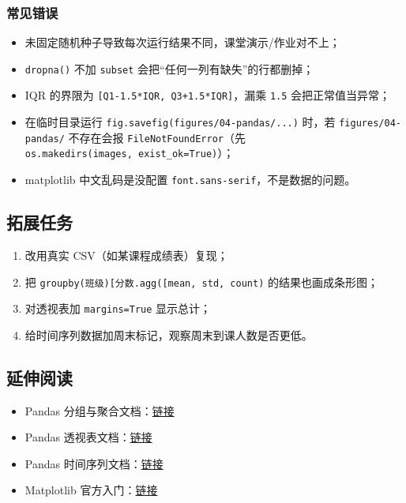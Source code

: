 \subsubsection{常见错误}\label{ux5e38ux89c1ux9519ux8bef-20}

\begin{itemize}
\tightlist
\item
  未固定随机种子导致每次运行结果不同，课堂演示/作业对不上；
\item
  \texttt{dropna()} 不加 \texttt{subset}
  会把``任何一列有缺失''的行都删掉；
\item
  IQR 的界限为 \texttt{{[}Q1-1.5*IQR,\ Q3+1.5*IQR{]}}，漏乘 \texttt{1.5}
  会把正常值当异常；
\item
  在临时目录运行
  \texttt{fig.savefig(\textquotesingle{}figures/04-pandas/...\textquotesingle{})}
  时，若 \texttt{figures/04-pandas/} 不存在会报
  \texttt{FileNotFoundError}（先
  \texttt{os.makedirs(\textquotesingle{}images\textquotesingle{},\ exist\_ok=True)}）；
\item
  matplotlib 中文乱码是没配置 \texttt{font.sans-serif}，不是数据的问题。
\end{itemize}

\subsection{拓展任务}\label{ux62d3ux5c55ux4efbux52a1-4}

\begin{enumerate}
\def\labelenumi{\arabic{enumi}.}
\tightlist
\item
  改用真实 CSV（如某课程成绩表）复现；
\item
  把
  \texttt{groupby(\textquotesingle{}班级\textquotesingle{}){[}\textquotesingle{}分数\textquotesingle{}{]}.agg({[}\textquotesingle{}mean\textquotesingle{},\ \textquotesingle{}std\textquotesingle{},\ \textquotesingle{}count\textquotesingle{}{]})}
  的结果也画成条形图；
\item
  对透视表加 \texttt{margins=True} 显示总计；
\item
  给时间序列数据加周末标记，观察周末到课人数是否更低。
\end{enumerate}

\subsection{延伸阅读}\label{ux5ef6ux4f38ux9605ux8bfb-19}

\begin{itemize}
\tightlist
\item
  Pandas
  分组与聚合文档：\href{https://pandas.pydata.org/docs/user_guide/groupby.html}{链接}
\item
  Pandas
  透视表文档：\href{https://pandas.pydata.org/docs/reference/api/pandas.pivot_table.html}{链接}
\item
  Pandas
  时间序列文档：\href{https://pandas.pydata.org/docs/user_guide/timeseries.html}{链接}
\item
  Matplotlib
  官方入门：\href{https://matplotlib.org/stable/tutorials/introductory/quick_start.html}{链接}
\end{itemize}

